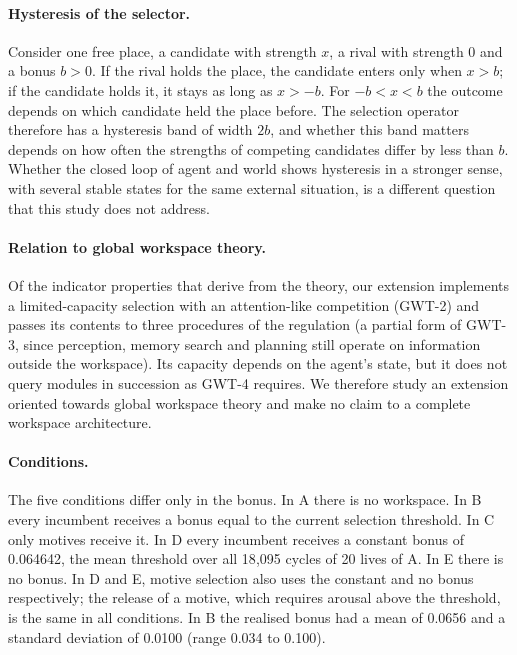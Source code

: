\documentclass[11pt,a4paper]{article}
\begin{document}
\paragraph{Hysteresis of the selector.} Consider one free place, a candidate with strength $x$, a rival with strength 0 and a bonus $b > 0$. If the rival holds the place, the candidate enters only when $x > b$; if the candidate holds it, it stays as long as $x > -b$. For $-b < x < b$ the outcome depends on which candidate held the place before. The selection operator therefore has a hysteresis band of width $2b$, and whether this band matters depends on how often the strengths of competing candidates differ by less than $b$. Whether the closed loop of agent and world shows hysteresis in a stronger sense, with several stable states for the same external situation, is a different question that this study does not address.

\paragraph{Relation to global workspace theory.} Of the indicator properties that \citet{butlin2023consciousness} derive from the theory, our extension implements a limited-capacity selection with an attention-like competition (GWT-2) and passes its contents to three procedures of the regulation (a partial form of GWT-3, since perception, memory search and planning still operate on information outside the workspace). Its capacity depends on the agent's state, but it does not query modules in succession as GWT-4 requires. We therefore study an extension oriented towards global workspace theory and make no claim to a complete workspace architecture.

\paragraph{Conditions.} The five conditions differ only in the bonus. In A there is no workspace. In B every incumbent receives a bonus equal to the current selection threshold. In C only motives receive it. In D every incumbent receives a constant bonus of 0.064642, the mean threshold over all 18{,}095 cycles of 20 lives of A. In E there is no bonus. In D and E, motive selection also uses the constant and no bonus respectively; the release of a motive, which requires arousal above the threshold, is the same in all conditions. In B the realised bonus had a mean of 0.0656 and a standard deviation of 0.0100 (range 0.034 to 0.100).
\end{document}
